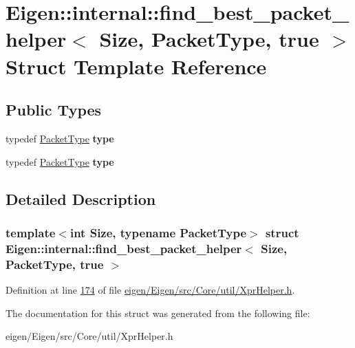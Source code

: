 \hypertarget{struct_eigen_1_1internal_1_1find__best__packet__helper_3_01_size_00_01_packet_type_00_01true_01_4}{}\section{Eigen\+:\+:internal\+:\+:find\+\_\+best\+\_\+packet\+\_\+helper$<$ Size, Packet\+Type, true $>$ Struct Template Reference}
\label{struct_eigen_1_1internal_1_1find__best__packet__helper_3_01_size_00_01_packet_type_00_01true_01_4}
\subsection*{Public Types}
\begin{DoxyCompactItemize}
\item 
\mbox{\label{struct_eigen_1_1internal_1_1find__best__packet__helper_3_01_size_00_01_packet_type_00_01true_01_4_a3f50d58b34c3bd7e4ff3311e5b30ac91}} 
typedef \hyperlink{struct_eigen_1_1_packet_type}{Packet\+Type} {\bfseries type}
\item 
\mbox{\label{struct_eigen_1_1internal_1_1find__best__packet__helper_3_01_size_00_01_packet_type_00_01true_01_4_a3f50d58b34c3bd7e4ff3311e5b30ac91}} 
typedef \hyperlink{struct_eigen_1_1_packet_type}{Packet\+Type} {\bfseries type}
\end{DoxyCompactItemize}


\subsection{Detailed Description}
\subsubsection*{template$<$int Size, typename Packet\+Type$>$\newline
struct Eigen\+::internal\+::find\+\_\+best\+\_\+packet\+\_\+helper$<$ Size, Packet\+Type, true $>$}



Definition at line \hyperlink{eigen_2_eigen_2src_2_core_2util_2_xpr_helper_8h_source_l00174}{174} of file \hyperlink{eigen_2_eigen_2src_2_core_2util_2_xpr_helper_8h_source}{eigen/\+Eigen/src/\+Core/util/\+Xpr\+Helper.\+h}.



The documentation for this struct was generated from the following file\+:\begin{DoxyCompactItemize}
\item 
eigen/\+Eigen/src/\+Core/util/\+Xpr\+Helper.\+h\end{DoxyCompactItemize}
